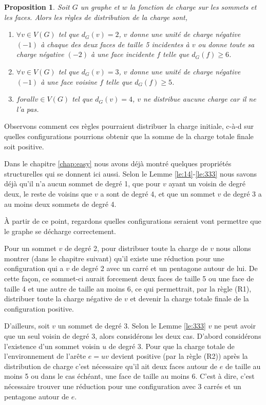 \documentclass[10pt,a4paper]{article}
\newtheorem{proposition}{Proposition}
\begin{document}
\begin{proposition}
Soit $G$ un graphe et $w$ la fonction de charge sur les sommets et les faces. Alors les règles de distribution de la charge sont,

\begin{enumerate}
\item [(R1)] $\forall v \in V(G)$ tel que $d_G(v) = 2$, $v$ donne une unité de charge négative $(-1)$ à chaque des deux faces de taille 5 incidentes à $v$ ou donne toute sa charge négative $(-2)$ à une face incidente $f$ telle que $d_G(f) \geq 6$.
\item [(R2)] $\forall v \in V(G)$ tel que $d_G(v) = 3$, $v$ donne une unité de charge négative $(-1)$ à une face voisine $f$ telle que $d_G(f) \geq 5$.
\item [(R3)] $forall v \in V(G)$ tel que $d_G(v) = 4$, $v$ ne distribue aucune charge car il ne l'a pas.
\end{enumerate}
\end{proposition}

Observons comment ces règles pourraient distribuer la charge initiale, c-à-d sur quelles configurations pourrions obtenir que la somme de la charge totale finale soit positive.

Dans le chapitre \ref{chap:easy} nous avons déjà montré quelques propriétés structurelles qui se donnent ici aussi. Selon le Lemme \ref{le:14}-\ref{le:333} nous savons déjà qu'il n'a aucun sommet de degré 1, que pour $v$ ayant un voisin de degré deux, le reste de voisins que $v$ a sont de degré 4, et que un sommet $v$ de degré 3 a au moins deux sommets de degré 4.

À partir de ce point, regardons quelles configurations seraient vont permettre que le graphe se décharge correctement. 

Pour un sommet $v$ de degré 2, pour distribuer toute la charge de $v$ nous allons montrer (dans le chapitre suivant) qu'il existe une réduction pour une configuration qui a $v$ de degré 2 avec un carré et un pentagone autour de lui. De cette façon, ce sommet-ci aurait forcement deux faces de taille 5 ou une face de taille 4 et une autre de taille au moins 6, ce qui permettrait,  par la règle (R1), distribuer toute la charge négative de $v$ et devenir la charge totale finale de la configuration positive.

D'ailleurs, soit $v$ un sommet de degré 3. Selon le Lemme \ref{le:333} $v$ ne peut avoir que un seul voisin de degré 3, alors considérons les deux cas. D'abord considérons l'existence d'un sommet voisin $u$ de degré 3. Pour que la charge totale de l'environnement de l'arête $e=uv$ devient positive (par la règle (R2)) après la distribution de charge c'est nécessaire qu'il ait deux faces autour de $e$ de taille au moins 5 ou dans le cas échéant, une face de taille au moins 6. C'est à dire, c'est nécessaire trouver une réduction pour une configuration avec 3 carrés et un pentagone autour de $e$. 
\end{document}
